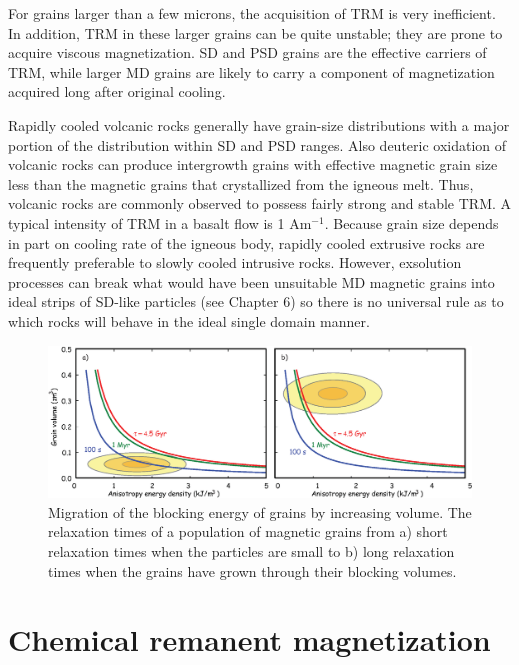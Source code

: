 For grains larger than a few microns, the acquisition of TRM is very inefficient.  In addition, TRM in these larger
grains can be quite unstable; they are prone to acquire viscous magnetization.   SD and PSD grains are the effective carriers of TRM, while larger MD grains are likely
to carry a component of magnetization acquired long after original cooling.

Rapidly cooled volcanic rocks generally have grain-size distributions
with a major portion of the distribution within SD and PSD ranges. Also deuteric
oxidation of volcanic rocks can produce intergrowth grains with effective magnetic grain size less than the
magnetic grains that crystallized from the igneous melt. Thus, volcanic rocks are commonly observed to
possess fairly strong and stable TRM. A typical intensity of TRM in a basalt flow is 1 Am$^{-1}$. Because grain size depends in part on cooling rate of the igneous body,  rapidly cooled extrusive rocks are frequently preferable to slowly cooled intrusive rocks.   However, exsolution processes can break what would have been unsuitable MD magnetic grains into ideal strips of SD-like particles (see Chapter 6) so there is no universal rule as to which rocks will behave in the ideal single domain manner.     

\begin{figure}[htb]
\centering  \includegraphics[width=14 cm]{EPSfiles/neel-crm.eps}
\caption{Migration of  the blocking energy of grains by increasing volume.  The relaxation times of a population of magnetic grains from a) short relaxation times when the particles are small  to b) long relaxation times when the grains have grown through their blocking volumes.    }
\label{fig:neel-crm}
\end{figure}


\section {Chemical remanent magnetization}
\label{sect:crm}

